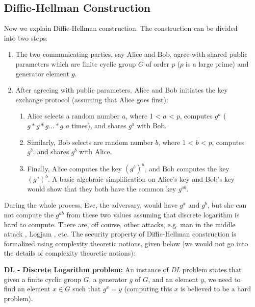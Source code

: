     
     
     \subsection{Diffie-Hellman Construction}
     \label{sec:diffie-hellman}
     	Now we explain Diffie-Hellman construction. The construction can be divided into two steps:
		\begin{enumerate}
		\item The two communicating parties, say Alice and Bob, agree with shared public parameters which 
		are finite cyclic group $G$ of order $p$ ($p$ is a large prime) and generator element $g$.
		\item After agreeing with public parameters, Alice and Bob initiates the key exchange protocol (assuming that 
		 Alice goes first):
		 \begin{enumerate}
		   \item Alice selects a random number $a$, where 1 < $a$ < $p$, computes $g^{a}$ ( $g * g * g ... * g$  $a$ times), and shares 
		   $g^{a}$ with Bob. 
		   \item Similarly, Bob selects are random number $b$, where 1 < $b$ < $p$, computes $g^{b}$, and shares  $g^{b}$
		   with Alice.
		   \item Finally, Alice computes the key $(g^{b})^{a}$, and Bob computes the key $(g^{a})^{b}$.  A basic 
		   algebraic simplification on Alice's key and Bob's key would show that they both have the 
		   common key  $g^{ab}$.
		   
		 \end{enumerate}
      \end{enumerate}		
      
     
      \noindent
       During the whole process, Eve, the adversary, would have $g^{a}$ and $g^{b}$, but she can not compute the 
      $ g^{ab}$ from these two values assuming that discrete logarithm is hard to compute. 
      There are, off course, other attacks, e.g.  man in the middle attack \citep{menezes2018handbook}, Logjam \citep{Adrian:2015:IFS:2810103.2813707}, etc. 
      The security property of Diffie-Hellman construction is formalized using complexity theoretic notions, 
      given below (we would not go into the details of complexity theoretic notions):
      
     
      \textbf{DL - Discrete Logarithm problem:} 
      An instance of \textit{DL} problem states that given a finite cyclic group $G$, a generator $g$ of $G$, and 
      an element $y$,  we need to find an element $x \in G$ such that $g^{x} = y$ (computing this $x$ is believed to be a 
      hard problem).
      
